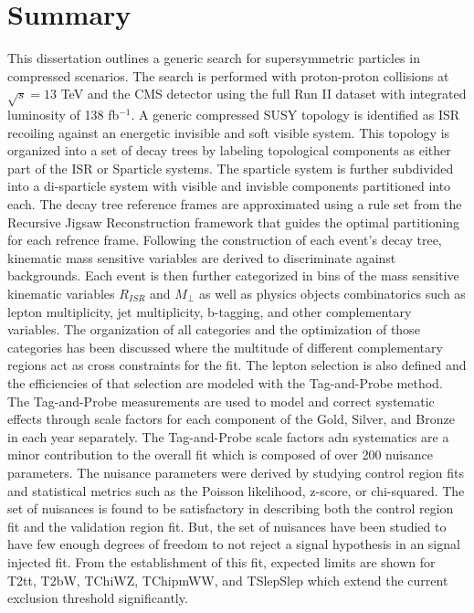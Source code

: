 \setcounter{secnumdepth}{3}
\setcounter{tocdepth}{3}
\setlength{\parskip}{\smallskipamount}
\setlength{\parindent}{0pt}


\makeatletter


\providecommand{\tabularnewline}{\\}


\makeatother


\chapter{Summary}


This dissertation outlines a generic search for supersymmetric particles in compressed scenarios. The search is performed with proton-proton collisions at $\sqrt{s} = 13$ TeV and the CMS detector using the full Run II dataset with integrated luminosity of 138 fb$^{-1}$. A generic compressed SUSY topology is identified as ISR recoiling against an energetic invisible and soft visible system. This topology is organized into a set of decay trees by labeling topological components as either part of the ISR or Sparticle systems. The sparticle system is further subdivided into a di-sparticle system with visible and invisble components partitioned into each. The decay tree reference frames are approximated using a rule set from the Recursive Jigsaw Reconstruction framework that guides the optimal partitioning for each refrence frame. Following the construction of each event's decay tree, kinematic mass sensitive variables are derived to discriminate against backgrounds. Each event is then further categorized in bins of the mass sensitive kinematic variables $R_{ISR}$ and $M_\perp$ as well as physics objects combinatorics such as lepton multiplicity, jet multiplicity, b-tagging, and other complementary variables. The organization of all categories and the optimization of those categories has been discussed where the multitude of different complementary regions act as cross constraints for the fit. The lepton selection is also defined and the efficiencies of that selection are modeled with the Tag-and-Probe method. The Tag-and-Probe measurements are used to  model and correct systematic effects through scale factors for each component of the Gold, Silver, and Bronze in each year separately. The Tag-and-Probe scale factors adn systematics are a minor contribution to the overall fit which is composed of over 200 nuisance parameters. The nuisance parameters were derived by studying control region fits and statistical metrics such as the Poisson likelihood, z-score, or chi-squared. The set of nuisances is found to be satisfactory in describing both the control region fit and the validation region fit. But, the set of nuisances have been studied to have few enough degrees of freedom to not reject a signal hypothesis in an signal injected fit. From the establishment of this fit, expected limits are shown for T2tt, T2bW, TChiWZ, TChipmWW, and TSlepSlep  which extend the current exclusion threshold significantly.   

